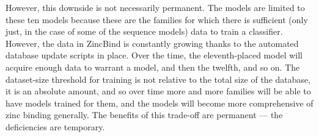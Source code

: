However, this downside is not necessarily permanent. The models are limited to these ten models because these are the families for which there is sufficient (only just, in the case of some of the sequence models) data to train a classifier. However, the data in ZincBind is constantly growing thanks to the automated database update scripts in place. Over the time, the eleventh-placed model will acquire enough data to warrant a model, and then the twelfth, and so on. The dataset-size threshold for training is not relative to the total size of the database, it is an absolute amount, and so over time more and more families will be able to have models trained for them, and the models will become more comprehensive of zinc binding generally. The benefits of this trade-off are permanent --- the deficiencies are temporary.






